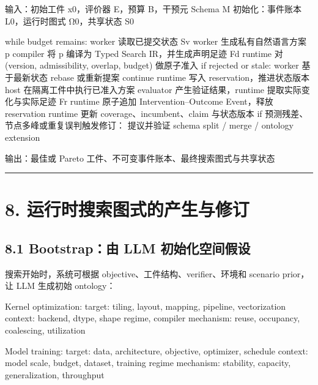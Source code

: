 \documentclass[
  11pt]{ctexart}
\newenvironment{Shaded}{}{}
\newcommand{\NormalTok}[1]{#1}
\begin{document}
\begin{Shaded}
\begin{Highlighting}[]
\NormalTok{输入：初始工件 x0，评价器 E，预算 B，干预元 Schema M}
\NormalTok{初始化：事件账本 L0，运行时图式 Ω0，共享状态 S0}

\NormalTok{while budget remains:}
\NormalTok{    worker 读取已提交状态 Sv}
\NormalTok{    worker 生成私有自然语言方案 p}
\NormalTok{    compiler 将 p 编译为 Typed Search IR，并生成声明足迹 Fd}
\NormalTok{    runtime 对 (version, admissibility, overlap, budget) 做原子准入}
\NormalTok{    if rejected or stale:}
\NormalTok{        worker 基于最新状态 rebase 或重新提案}
\NormalTok{        continue}
\NormalTok{    runtime 写入 reservation，推进状态版本}
\NormalTok{    host 在隔离工件中执行已准入方案}
\NormalTok{    evaluator 产生验证结果，runtime 提取实际变化与实际足迹 Fr}
\NormalTok{    runtime 原子追加 Intervention–Outcome Event，释放 reservation}
\NormalTok{    runtime 更新 coverage、incumbent、claim 与状态版本}
\NormalTok{    if 预测残差、节点多峰或重复误判触发修订：}
\NormalTok{        提议并验证 schema split / merge / ontology extension}

\NormalTok{输出：最佳或 Pareto 工件、不可变事件账本、最终搜索图式与共享状态}
\end{Highlighting}
\end{Shaded}

\begin{center}\rule{0.5\linewidth}{0.5pt}\end{center}

\section{8.
运行时搜索图式的产生与修订}\label{ux8fd0ux884cux65f6ux641cux7d22ux56feux5f0fux7684ux4ea7ux751fux4e0eux4feeux8ba2}

\subsection{8.1 Bootstrap：由 LLM
初始化空间假设}\label{bootstrapux7531-llm-ux521dux59cbux5316ux7a7aux95f4ux5047ux8bbe}

搜索开始时，系统可根据 objective、工件结构、verifier、环境和 scenario
prior，让 LLM 生成初始 ontology：

\begin{Shaded}
\begin{Highlighting}[]
\NormalTok{Kernel optimization:}
\NormalTok{  target: tiling, layout, mapping, pipeline, vectorization}
\NormalTok{  context: backend, dtype, shape regime, compiler}
\NormalTok{  mechanism: reuse, occupancy, coalescing, utilization}

\NormalTok{Model training:}
\NormalTok{  target: data, architecture, objective, optimizer, schedule}
\NormalTok{  context: model scale, budget, dataset, training regime}
\NormalTok{  mechanism: stability, capacity, generalization, throughput}
\end{Highlighting}
\end{Shaded}
\end{document}
